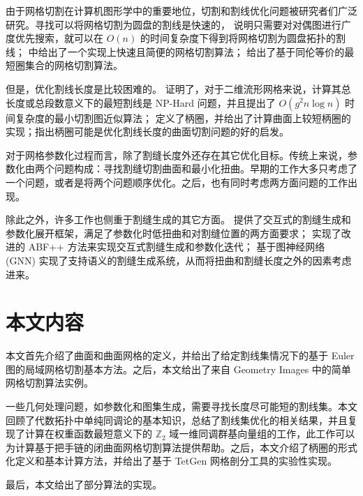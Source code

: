 由于网格切割在计算机图形学中的重要地位，切割和割线优化问题被研究者们广泛研究。寻找可以将网格切割为圆盘的割线是快速的，\citet{Dey1995} 说明只需要对对偶图进行广度优先搜索，就可以在 $ O(n) $ 的时间复杂度下得到将网格切割为圆盘拓扑的割线；\citet{Gu2002} 中给出了一个实现上快速且简便的网格切割算法；\citet{DeVerdiere2005} 给出了基于同伦等价的最短圈集合的网格切割算法。

但是，优化割线长度是比较困难的。\citet{Erickson2002} 证明了，对于二维流形网格来说，计算其总长度或总段数意义下的最短割线是 NP-Hard 问题，并且提出了 $ O(g^2 n \log n) $ 时间复杂度的最小切割图近似算法；\citet{oncomputinghantun} 定义了柄圈，并给出了计算曲面上较短柄圈的实现\cite{Dey2013}\cite{Dey2008}；\citet{Chai2018}指出柄圈可能是优化割线长度的曲面切割问题的好的启发。

对于网格参数化过程而言，除了割缝长度外还存在其它优化目标。传统上来说，参数化由两个问题构成：寻找割缝切割曲面\cite{qdmeshseg}\cite{KhodakovskyLS03}和最小化扭曲\cite{Desbrun2002}\cite{KhodakovskyLS03}。早期的工作大多只考虑了一个问题，或者是将两个问题顺序优化。之后，也有同时考虑两方面问题的工作出现\cite{Li2018}。

除此之外，许多工作也侧重于割缝生成的其它方面。\citet{Poranne2017} 提供了交互式的割缝生成和参数化展开框架，满足了参数化时低扭曲和对割缝位置的两方面要求；\citet{wysiwyg} 实现了改进的 ABF++ 方法来实现交互式割缝生成和参数化迭代；\citet{teimury2020graphseam} 基于图神经网络 (GNN) 实现了支持语义的割缝生成系统，从而将扭曲和割缝长度之外的因素考虑进来。

\section{本文内容}

本文首先介绍了曲面和曲面网格的定义，并给出了给定割线集情况下的基于 Euler 图的局域网格切割基本方法。之后，本文给出了来自 Geometry Images 中的简单网格切割算法实例。
  
一些几何处理问题，如参数化和图集生成，需要寻找长度尽可能短的割线集。本文回顾了代数拓扑中单纯同调论的基本知识，总结了割线集优化的相关结果，并且复现了计算在权重函数最短意义下的 $ \mathbb{Z}_2 $ 域一维同调群基向量组的工作，此工作可以为计算基于把手链的闭曲面网格切割算法提供帮助。之后，本文介绍了柄圈的形式化定义和基本计算方法，并给出了基于 TetGen 网格剖分工具\cite{Si2015}的实验性实现。

最后，本文给出了部分算法的实现。


